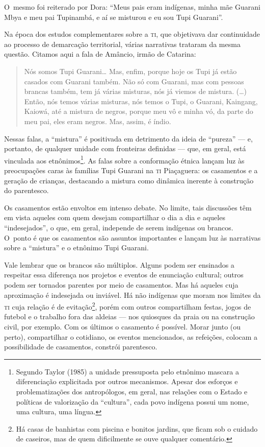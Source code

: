 O~mesmo foi reiterado por Dora: ``Meus pais eram indígenas, minha mãe
Guarani Mbya e meu pai Tupinambá, e aí se misturou e eu sou Tupi
Guarani''.

Na época dos estudos complementares sobre a \textsc{ti}, que objetivava dar
continuidade ao processo de demarcação territorial, várias narrativas
trataram da mesma questão. Citamos aqui a fala de Amâncio, irmão de
Catarina:

\begin{quote}
\noindent
Nós somos Tupi Guarani\ldots{} Mas, enfim, porque hoje os Tupi já estão
casados com Guarani também. Não só com Guarani, mas com pessoas brancas
também, tem já várias misturas, nós já viemos de mistura. (\ldots{}) Então,
nós temos várias misturas, nós temos o Tupi, o Guarani, Kaingang,
Kaiowá, até a mistura de negros, porque meu vô e minha vó, da parte do
meu pai, eles eram negros. Mas, assim, é índio.
\end{quote} 

Nessas falas, a ``mistura'' é positivada em detrimento da ideia de ``pureza'' ---
e, portanto, de qualquer unidade com fronteiras definidas --- que, em
geral, está vinculada aos etnônimos\footnote{Segundo Taylor (1985) a
unidade pressuposta pelo etnônimo mascara a diferenciação explicitada
por outros mecanismos. Apesar dos esforços e problematizações dos
antropólogos, em geral, nas relações com o Estado e políticas de
valorização da ``cultura'', cada povo indígena possui um nome, uma
cultura, uma língua.}. As falas sobre a conformação étnica lançam luz
às preocupações caras às famílias Tupi Guarani na \textsc{ti} Piaçaguera: os
casamentos e a geração de crianças, destacando a mistura como dinâmica
inerente à construção do parentesco.

Os casamentos estão envoltos em intenso debate. No limite, tais
discussões têm em vista aqueles com quem desejam compartilhar o dia a
dia e aqueles ``indesejados'', o que, em geral, independe de serem
indígenas ou brancos. O~ponto é que os casamentos são assuntos
importantes e lançam luz às narrativas sobre a ``mistura'' e o etnônimo
Tupi Guarani.

Vale lembrar que os brancos são múltiplos. Alguns podem ser ensinados a
respeitar essa diferença nos projetos e eventos de enunciação cultural;
outros podem ser tornados parentes por meio de casamentos. Mas há
aqueles cuja aproximação é indesejada ou inviável. Há não indígenas que
moram nos limites da \textsc{ti} cuja relação é de evitação\footnote{Há casas de
banhistas com piscina e bonitos jardins, que ficam sob o cuidado de
caseiros, mas de quem dificilmente se ouve qualquer comentário.}, porém
com outros compartilham festas, jogos de futebol e o trabalho fora das
aldeias --- nos quiosques da praia ou na construção civil, por exemplo.
Com os últimos o casamento é possível. Morar junto (ou perto),
compartilhar o cotidiano, os eventos mencionados, as refeições, colocam
a possibilidade de casamentos, constrói parentesco. 

